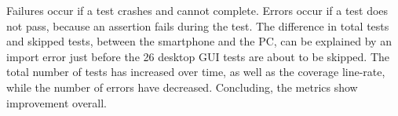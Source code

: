 Failures occur if a test crashes and cannot complete.
Errors occur if a test does not pass, because an assertion fails during the test.
The difference in total tests and skipped tests, between the smartphone and the PC, can be explained by an import error just before the 26 desktop GUI tests are about to be skipped.
The total number of tests has increased over time, as well as the coverage line-rate, while the number of errors have decreased.
Concluding, the metrics show improvement overall.

